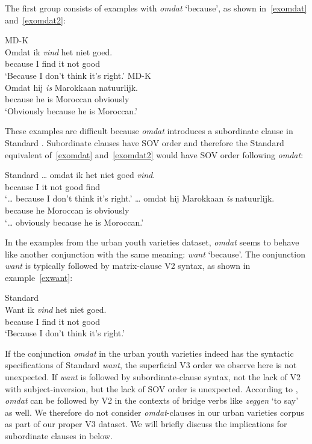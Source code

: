 \documentclass[output=paper]{langsci/langscibook}
\begin{document}
The first group consists of examples with \emph{omdat} `because', as shown
in~\eqref{exomdat} and~\eqref{exomdat2}:

\ea
    \ea MD-K\\
    \gll\label{exomdat}Omdat ik \textit{vind} het niet goed.\\
    because I find it not good\\
    \trans \enquote*{Because I don't think it's right.}
    \ex MD-K\\
    \gll\label{exomdat2}Omdat hij \textit{is} Marokkaan natuurlijk.\\
    because he is Moroccan obviously\\
    \trans \enquote*{Obviously because he is Moroccan.}
    \z
\z

\noindent These examples are difficult because \emph{omdat} introduces a
subordinate clause in Standard . Subordinate clauses have SOV order and
therefore the Standard  equivalent of~\eqref{exomdat} and~\eqref{exomdat2}
would have SOV order following \emph{omdat}:

\ea Standard 
    \ea
    \gll \dots{} omdat ik het niet goed \textit{vind}.\\
    {} because I it not good find\\
    \trans \enquote*{\dots{} because I don't think it's right.}
    \ex
    \gll \dots{} omdat hij Marokkaan \textit{is} natuurlijk.\\
    {} because he Moroccan is obviously\\
    \trans \enquote*{\dots{} obviously because he is Moroccan.}
    \z
\z

\noindent In the examples from the  urban youth varieties dataset,
\emph{omdat} seems to behave like another  conjunction with the same
meaning: \emph{want} `because'. The conjunction \emph{want} is typically
followed by matrix-clause V2 syntax, as shown in example~\eqref{exwant}:

\ea Standard \\
    \gll\label{exwant}Want ik \textit{vind} het niet goed.\\
    because I find it not good\\
    \trans \enquote*{Because I don't think it's right.}
\z

\noindent If the conjunction \emph{omdat} in the  urban youth varieties
indeed has the syntactic specifications of Standard  \emph{want}, the
superficial V3 order we observe here is not unexpected. If \emph{want} is
followed by subordinate-clause syntax, not the lack of V2 with
subject-inversion, but the lack of SOV order is unexpected. According to
\citet[123--125]{Zwart:2011}, \emph{omdat} can be followed by V2 in the
contexts of bridge verbs like \emph{zeggen} `to say' as well. We therefore do
not consider \emph{omdat}-clauses in our urban varieties corpus as part of
our proper V3 dataset. We will briefly discuss the implications for subordinate
clauses in  below.
\end{document}
